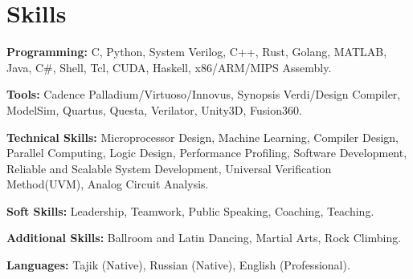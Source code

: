 \documentclass[letterpaper,11pt]{article}
\newcommand{\resumeSubHeadingListStart}{\begin{itemize}[leftmargin=0.15in, label={}]}
\newcommand{\resumeSubHeadingListEnd}{\end{itemize}}
\begin{document}

\section{Skills}
  \vspace{2pt}
  \resumeSubHeadingListStart
    \small{\item{
        \textcolor{secondary_color}{\textbf{Programming:}}{ C, Python, System Verilog, C++, Rust, Golang, MATLAB, Java, C\#, Shell, Tcl, CUDA, Haskell, x86/ARM/MIPS Assembly.} \\ \vspace{3pt}
        
        \textcolor{secondary_color}{\textbf{Tools:}}{ Cadence Palladium/Virtuoso/Innovus, Synopsis Verdi/Design Compiler, ModelSim, Quartus, Questa, Verilator, Unity3D, Fusion360.} \\ \vspace{3pt}

        \textcolor{secondary_color}{\textbf{Technical Skills:}}{ Microprocessor Design, Machine Learning, Compiler Design, Parallel Computing, Logic Design, Performance Profiling, Software Development, Reliable and Scalable System Development, Universal Verification Method(UVM), Analog Circuit Analysis.} \\ \vspace{3pt}
        
        \textcolor{secondary_color}{\textbf{Soft Skills:}}{ Leadership, Teamwork, Public Speaking, Coaching, Teaching.} \\ \vspace{3pt}
        
        \textcolor{secondary_color}{\textbf{Additional Skills:}}{ Ballroom and Latin Dancing, Martial Arts, Rock Climbing.} \\ \vspace{3pt}

        \textcolor{secondary_color}{\textbf{Languages:}}{ Tajik (Native), Russian (Native), English (Professional).}
        
    }}
  \resumeSubHeadingListEnd



\end{document}
